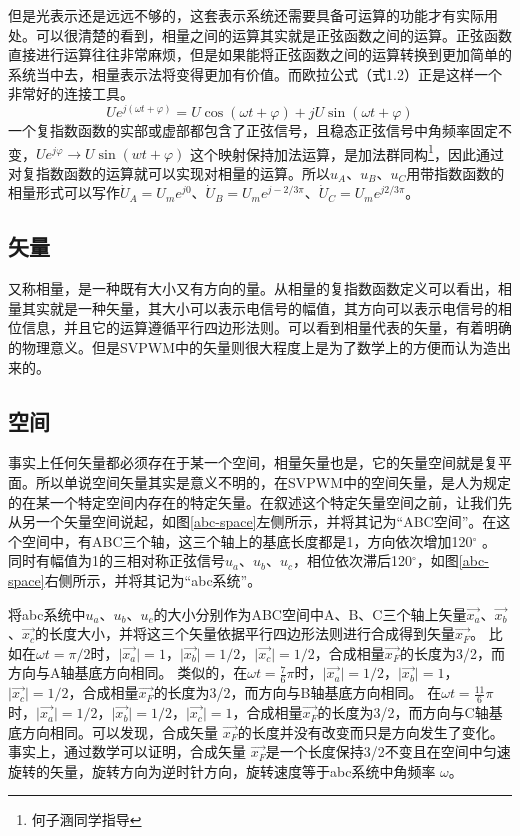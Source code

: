 \documentclass{ctexart}
\numberwithin{equation}{section}
\begin{document}
但是光表示还是远远不够的，这套表示系统还需要具备可运算的功能才有实际用处。可以很清楚的看到，相量之间的运算其实就是正弦函数之间的运算。正弦函数直接进行运算往往非常麻烦，但是如果能将正弦函数之间的运算转换到更加简单的系统当中去，相量表示法将变得更加有价值。而欧拉公式（式1.2）正是这样一个非常好的连接工具。
\begin{equation}
  Ue^{j(\omega t + \varphi)} = U\cos (\omega t + \varphi) +jU\sin (\omega t + \varphi)
\end{equation}
一个复指数函数的实部或虚部都包含了正弦信号，且稳态正弦信号中角频率固定不变，$Ue^{j\varphi} \to U\sin(wt+\varphi)$ 这个映射保持加法运算，是加法群同构\footnote{何子涵同学指导}，因此通过对复指数函数的运算就可以实现对相量的运算。所以$ u_A $、$ u_B $、$ u_C $用带指数函数的相量形式可以写作$ \dot U_A = U_m e^{j0} $、$ \dot U_B = U_m e^{j-2/3\pi} $、$ \dot U_C = U_m e^{j2/3\pi} $。

\subsection{矢量}
又称相量，是一种既有大小又有方向的量。从相量的复指数函数定义可以看出，相量其实就是一种矢量，其大小可以表示电信号的幅值，其方向可以表示电信号的相位信息，并且它的运算遵循平行四边形法则。可以看到相量代表的矢量，有着明确的物理意义。但是SVPWM中的矢量则很大程度上是为了数学上的方便而认为造出来的。

\subsection{空间}
事实上任何矢量都必须存在于某一个空间，相量矢量也是，它的矢量空间就是复平面。所以单说空间矢量其实是意义不明的，在SVPWM中的空间矢量，是人为规定的在某一个特定空间内存在的特定矢量。在叙述这个特定矢量空间之前，让我们先从另一个矢量空间说起，如图\ref{abc-space}左侧所示，并将其记为“ABC空间”。在这个空间中，有ABC三个轴，这三个轴上的基底长度都是1，方向依次增加120$ ^\circ $ 。
同时有幅值为1的三相对称正弦信号$u_a$、$u_b$、$u_c$，相位依次滞后120$ ^\circ $，如图\ref{abc-space}右侧所示，并将其记为“abc系统”。

将abc系统中$u_a$、$u_b$、$u_c$的大小分别作为ABC空间中A、B、C三个轴上矢量$\vec{x_{a}}$、$\vec{x_{b}}$、$\vec{x_{c}}$的长度大小，并将这三个矢量依据平行四边形法则进行合成得到矢量$\vec{x_F}$。
比如在$ \omega t = \pi /2 $时，$ \vert \vec{x_a} \vert = 1 $，$ \vert \vec{x_b} \vert = 1/2 $，$ \vert \vec{x_c} \vert = 1/2 $，合成相量$  \vec{x_F} $的长度为3/2，而方向与A轴基底方向相同。
类似的，在$ \omega t = \frac{7}{6}\pi $时，$ \vert \vec{x_a} \vert = 1/2 $，$ \vert \vec{x_b} \vert = 1 $，$ \vert \vec{x_c} \vert = 1/2 $，合成相量$  \vec{x_F} $的长度为3/2，而方向与B轴基底方向相同。
在$ \omega t = \frac{11}{6}\pi $时，$ \vert \vec{x_a} \vert = 1/2 $，$ \vert \vec{x_b} \vert = 1/2 $，$ \vert \vec{x_c} \vert = 1 $，合成相量$  \vec{x_F} $的长度为3/2，而方向与C轴基底方向相同。可以发现，合成矢量 $ \vec{x_F} $的长度并没有改变而只是方向发生了变化。事实上，通过数学可以证明，合成矢量 $ \vec{x_F} $是一个长度保持3/2不变且在空间中匀速旋转的矢量，旋转方向为逆时针方向，旋转速度等于abc系统中角频率 $ \omega $。
\end{document}
